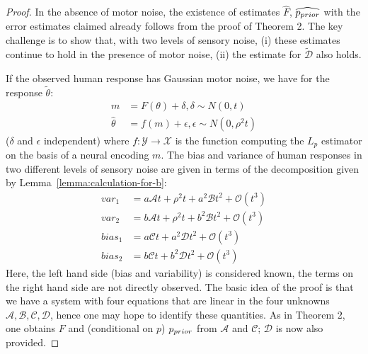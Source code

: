 \begin{proof}
In the absence of motor noise, the existence of estimates $\widehat{F}$, $\widehat{p_{prior}}$ with the error estimates claimed already follows from the proof of Theorem 2. 
    The key challenge is to show that, with two levels of sensory noise, (i) these estimates continue to hold in the presence of motor noise, (ii) the estimate for $\tilde{\mathcal{D}}$ also holds.
    
    If the observed human response has Gaussian motor noise, we have for the response $\tilde{\theta}$:
    \begin{align*}
        m &= F(\theta) + \delta, \delta \sim N(0, t)\\
        \widehat{\theta} &= f(m) + \epsilon, \epsilon \sim N(0, \rho^2 t)
    \end{align*}
    ($\delta$ and $\epsilon$ independent) where $f : \mathcal{Y} \rightarrow \mathcal{X}$ is the function computing the $L_p$ estimator on the basis of a neural encoding $m$.
    The bias and variance of human responses in two different levels of sensory noise are given in terms of the decomposition given by Lemma~\ref{lemma:calculation-for-b}:
    \begin{equation}\label{eq:four-expansions}
    \begin{aligned}
        var_1 &= a\mathcal{A}t + \rho^2t + a^2\mathcal{B}t^2 + \mathcal{O}(t^3)\\
        var_2 &= b\mathcal{A}t + \rho^2t + b^2\mathcal{B}t^2 + \mathcal{O}(t^3)\\
        bias_1 &= a\mathcal{C}t + a^2\mathcal{D}t^2 + \mathcal{O}(t^3)\\
        bias_2 &= b\mathcal{C}t + b^2\mathcal{D}t^2 + \mathcal{O}(t^3)
    \end{aligned}
    \end{equation}
    Here, the left hand side (bias and variability) is considered known, the terms on the right hand side are not directly observed.
    The basic idea of the proof is that we have a system with four equations that are linear in the four unknowns $\mathcal{A}, \mathcal{B}, \mathcal{C}, \mathcal{D}$, hence one may hope to identify these quantities. As in Theorem 2, one obtains $F$ and (conditional on $p$) $p_{prior}$ from $\mathcal{A}$ and $\mathcal{C}$; $\mathcal{D}$ is now also provided.



\end{proof}

